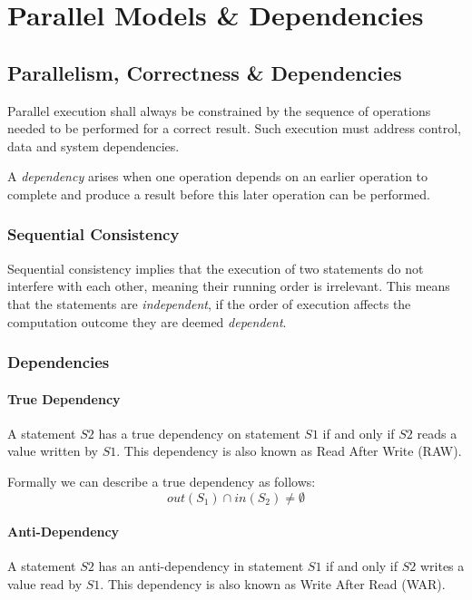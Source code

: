 \section{Parallel Models \& Dependencies}

\subsection{Parallelism, Correctness \& Dependencies}

Parallel execution shall always be constrained by the sequence of operations needed to be performed for a correct result.
Such execution must address control, data and system dependencies.

A \textit{dependency} arises when one operation depends on an earlier operation to complete and produce a result before this later operation can be performed.

\subsubsection{Sequential Consistency}

Sequential consistency implies that the execution of two statements do not interfere with each other, meaning their running order is irrelevant.
This means that the statements are \textit{independent},
if the order of execution affects the computation outcome they are deemed \textit{dependent}.

\subsubsection{Dependencies}

\paragraph{True Dependency}
A statement $S2$ has a true dependency on statement $S1$ if and only if $S2$ reads a value written by $S1$.
This dependency is also known as Read After Write (RAW).

Formally we can describe a true dependency as follows:
\begin{equation*}
    out(S_1) \cap in(S_2) \neq \emptyset
\end{equation*}

\paragraph{Anti-Dependency}
A statement $S2$ has an anti-dependency in statement $S1$ if and only if $S2$ writes a value read by $S1$.
This dependency is also known as Write After Read (WAR).

